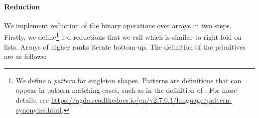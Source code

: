 \paragraph{Reduction} We implement reduction of the binary operations
over arrays in two steps.  Firstly, we define\footnote{
We define a \emph{pattern}  for singleton shapes.  Patterns are
definitions that can appear in pattern-matching
cases, such as in the definition of .  For more details, see
\url{https://agda.readthedocs.io/en/v2.7.0.1/language/pattern-synonyms.html}.
} 1-d reductions  that
we call  which is similar to right fold on lists.
Arrays of higher ranks iterate  bottom-up.  The definition
of the primitives are as follows:
